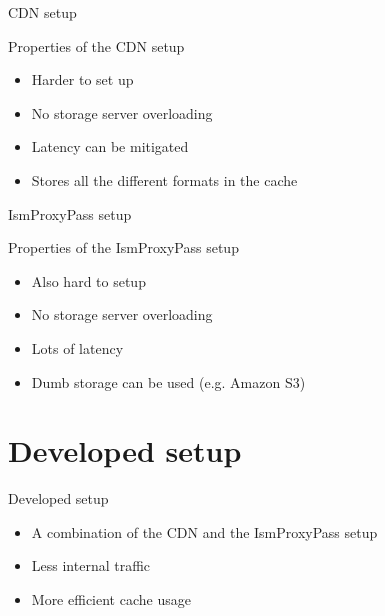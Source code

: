 \documentclass[xcolor=svgnames,handout]{beamer}
\begin{document}
\begin{frame}{CDN setup}
    \begin{figure}

        \resizebox{\textwidth}{!}{%
            
        }
    \end{figure}
\end{frame}

\begin{frame}{Properties of the CDN setup}
  \begin{itemize}
  \item Harder to set up
  \item No storage server overloading
  \item Latency can be mitigated
  \item Stores all the different formats in the cache
  \end{itemize}
\end{frame}

\begin{frame}{IsmProxyPass setup}
    \begin{figure}

        \resizebox{\textwidth}{!}{%
            
        }
    \end{figure}
\end{frame}

\begin{frame}{Properties of the IsmProxyPass setup}
  \begin{itemize}
  \item Also hard to setup
  \item No storage server overloading
  \item Lots of latency
  \item Dumb storage can be used (e.g. Amazon S3)
  \end{itemize}
\end{frame}


\section{Developed setup}

\begin{frame}{Developed setup}
    \begin{itemize}
        \item A combination of the CDN and the IsmProxyPass setup
        \item Less internal traffic
        \item More efficient cache usage
    \end{itemize}
\end{frame}
\end{document}
